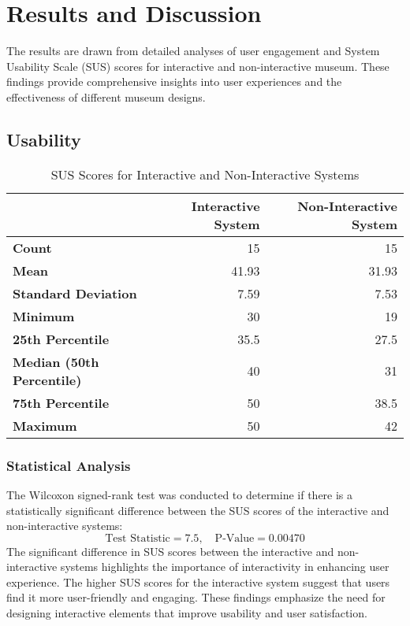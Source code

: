 \documentclass[conference]{IEEEtran}
\begin{document}
\section{Results and Discussion}

The results are drawn from detailed analyses of user engagement and System Usability Scale (SUS) scores for interactive and non-interactive museum. These findings provide comprehensive insights into user experiences and the effectiveness of different museum designs.

\subsection{Usability}
\begin{table}[h]
    \centering
    \begin{tabular}{|l|r|r|}
    \hline
                             & \textbf{Interactive System} & \textbf{Non-Interactive System} \\ \hline
    \textbf{Count}           & 15                          & 15                              \\ \hline
    \textbf{Mean}            & 41.93                       & 31.93                           \\ \hline
    \textbf{Standard Deviation} & 7.59                       & 7.53                            \\ \hline
    \textbf{Minimum}         & 30                          & 19                              \\ \hline
    \textbf{25th Percentile} & 35.5                        & 27.5                            \\ \hline
    \textbf{Median (50th Percentile)} & 40                 & 31                              \\ \hline
    \textbf{75th Percentile} & 50                          & 38.5                            \\ \hline
    \textbf{Maximum}         & 50                          & 42                              \\ \hline
    \end{tabular}
    \caption{SUS Scores for Interactive and Non-Interactive Systems}
\end{table}

\subsubsection{Statistical Analysis}
The Wilcoxon signed-rank test was conducted to determine if there is a statistically significant difference between the SUS scores of the interactive and non-interactive systems:
\[
\text{Test Statistic} = 7.5, \quad \text{P-Value} = 0.00470
\]
The significant difference in SUS scores between the interactive and non-interactive systems highlights the importance of interactivity in enhancing user experience. The higher SUS scores for the interactive system suggest that users find it more user-friendly and engaging. These findings emphasize the need for designing interactive elements that improve usability and user satisfaction.
\end{document}
